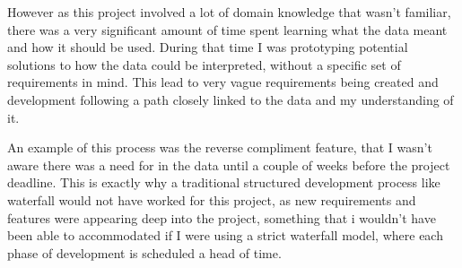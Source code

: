 However as this project involved a lot of domain knowledge that wasn't familiar, there was a very significant amount of time spent learning what the data meant and how it should be used. During that time I was prototyping potential solutions to how the data could be interpreted, without a specific set of requirements in mind. This lead to very vague requirements being created and development following a path closely linked to the data and my understanding of it. 

An example of this process was the reverse compliment feature, that I wasn't aware there was a need for in the data until a couple of weeks before the project deadline. This is exactly why a traditional structured development process like waterfall would not have worked for this project, as new requirements and features were appearing deep into the project, something that i wouldn't have been able to accommodated if I were using a strict waterfall model, where each phase of development is scheduled a head of time.


